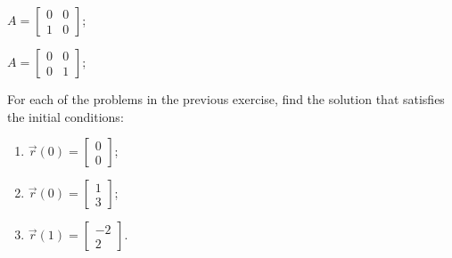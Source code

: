 \begin{exercises}
\begin{problist}
\begin{enumerate}
\begin{minipage}{.2\textwidth}
		\item $A = \begin{bmatrix} 0 & 0 \\ 1 & 0\end{bmatrix}$; 
		\item $A = \begin{bmatrix} 0 & 0 \\ 0 & 1\end{bmatrix}$; 
	\end{minipage}
	\end{enumerate}

	\prob For each of the problems in the previous exercise, find the solution that satisfies the initial conditions:
	\begin{enumerate}[label=(\roman*)]
		\item $\vec{r}(0)=\begin{bmatrix} 0 \\ 0 \end{bmatrix}$;
		\item $\vec{r}(0)=\begin{bmatrix} 1 \\ 3 \end{bmatrix}$;
		\item $\vec{r}(1)=\begin{bmatrix} -2 \\ 2 \end{bmatrix}$.
	\end{enumerate}



\end{problist}
\end{exercises}
